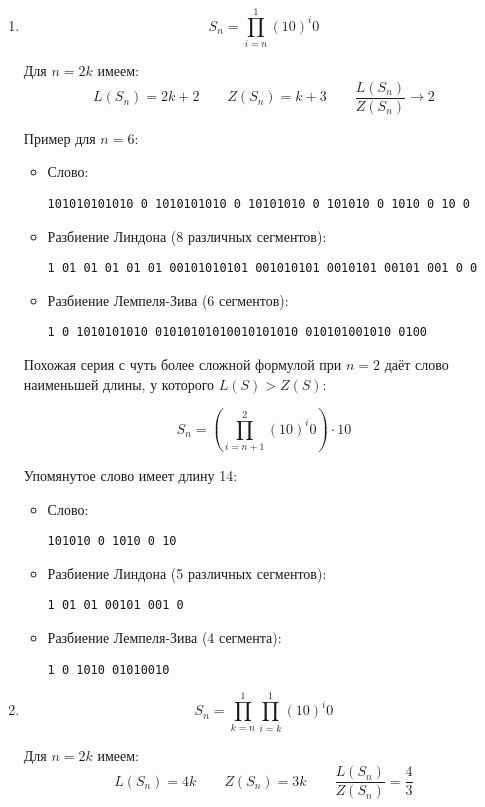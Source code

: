 \begin{enumerate}

\item
    $$ S_n = \prod_{i = n}^{1} (10)^i 0 $$
    
    Для $ n = 2 k $ имеем:
    $$ L(S_n) = 2 k + 2 \qquad Z(S_n) = k + 3 \qquad \frac{L(S_n)}{Z(S_n)} \to 2 $$
    
    Пример для $ n = 6 $:
    
    \begin{itemize}
    \item
        Слово:
        
        \texttt{101010101010 0 1010101010 0 10101010 0 101010 0 1010 0 10 0}
    \item
        Разбиение Линдона (8 различных сегментов):
        
        \texttt{1 01 01 01 01 01 00101010101 001010101 0010101 00101 001 0 0}
    \item
        Разбиение Лемпеля-Зива (6 сегментов):
        
        \texttt{1 0 1010101010 01010101010010101010 010101001010 0100}
    \end{itemize}
    
    Похожая серия с чуть более сложной формулой при $ n = 2 $ даёт слово наименьшей длины, у которого $ L(S) > Z(S) $:
    
    $$ S_n = \left ( \prod_{i = n + 1}^{2} (10)^i 0 \right ) \cdot 10 $$
    
    Упомянутое слово имеет длину 14:
    
    \begin{itemize}
    \item
        Слово:
        
        \texttt{101010 0 1010 0 10}
    \item
        Разбиение Линдона (5 различных сегментов):
        
        \texttt{1 01 01 00101 001 0}
    \item
        Разбиение Лемпеля-Зива (4 сегмента):
        
        \texttt{1 0 1010 01010010}
    \end{itemize}
    
\item
    $$ S_n = \prod_{k = n}^{1} \prod_{i = k}^{1} (10)^i 0 $$
    
    Для $ n = 2 k $ имеем:
    $$ L(S_n) = 4 k \qquad Z(S_n) = 3 k \qquad \frac{L(S_n)}{Z(S_n)} = \frac{4}{3} $$
    

\end{enumerate}
